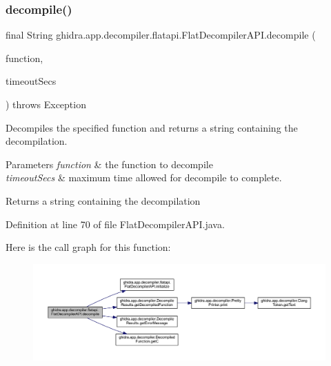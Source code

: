 \subsubsection{\texorpdfstring{decompile()}{decompile()}\hspace{0.1cm}{\footnotesize\ttfamily [2/2]}}
{\footnotesize\ttfamily final String ghidra.\+app.\+decompiler.\+flatapi.\+Flat\+Decompiler\+A\+P\+I.\+decompile (\begin{DoxyParamCaption}\item[{Function}]{function,  }\item[{int}]{timeout\+Secs }\end{DoxyParamCaption}) throws Exception\hspace{0.3cm}{\ttfamily [inline]}}

Decompiles the specified function and returns a string containing the decompilation. 
\begin{DoxyParams}{Parameters}
{\em function} & the function to decompile \\
\hline
{\em timeout\+Secs} & maximum time allowed for decompile to complete. \\
\hline
\end{DoxyParams}
\begin{DoxyReturn}{Returns}
a string containing the decompilation 
\end{DoxyReturn}


Definition at line 70 of file Flat\+Decompiler\+A\+P\+I.\+java.

Here is the call graph for this function\+:
\nopagebreak
\begin{figure}[H]
\begin{center}
\leavevmode
\includegraphics[width=350pt]{classghidra_1_1app_1_1decompiler_1_1flatapi_1_1_flat_decompiler_a_p_i_a83e63ba2faea29732064cee33edab094_cgraph}
\end{center}
\end{figure}
\mbox{\label{classghidra_1_1app_1_1decompiler_1_1flatapi_1_1_flat_decompiler_a_p_i_af23bd29dc1cf1a2b95683c2ac34340ef}} 
